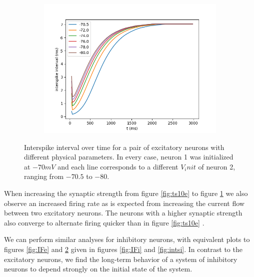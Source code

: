 \documentclass{article}
\begin{document}
\begin{figure}[h]
	\hspace{0.03\linewidth}
	\begin{subfigure}[t]{0.30\linewidth}
		\centering
		\includegraphics[width = 1.0\linewidth, trim={20 10 20 20}, clip=true]{intervals_ts_10_rmgs_05e.png}
		\label{fig:ts10rmgs}	
	\end{subfigure}%
\caption{Interspike interval over time for a pair of excitatory neurons with different physical parameters. In every case, neuron 1 was initialized at $-70 mV$ and each line corresponds to a different $V_init$ of neuron 2, ranging from $-70.5$ to $-80$.}
\label{fig:intse}
\end{figure}

When increasing the synaptic strength from figure \ref{fig:ts10e} to figure \ref{fig:ts10rmgs} we also observe an increased firing rate as is expected from increasing the current flow between two excitatory neurons. The neurons with a higher synaptic strength also converge to alternate firing quicker than in figure \ref{fig:ts10e} .

We can perform similar analyses for inhibitory neurons, with equivalent plots to figures \ref{fig:IFe} and \ref{fig:intse} given in figures \ref{fig:IFi} and \ref{fig:intsi}. In contrast to the excitatory neurons, we find the long-term behavior of a system of inhibitory neurons to depend strongly on the initial state of the system.
\end{document}
